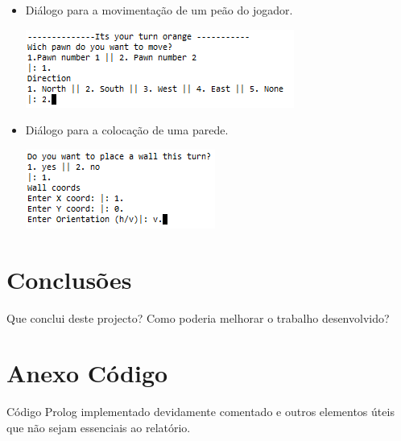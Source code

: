 \documentclass[a4paper]{article}
\begin{document}
  \begin{itemize}
		\item Diálogo para a movimentação de um peão do jogador.	
		\begin{center}
			\includegraphics[scale = 0.7]{fig7.png}
		\end{center}
		\item Diálogo para a colocação de uma parede.
		\begin{center}
			\includegraphics[scale = 0.7]{fig8.png}
		\end{center}
	\end{itemize}






\section{Conclusões}
Que conclui deste projecto? Como poderia melhorar o trabalho desenvolvido?


\clearpage
{}
\renewcommand\refname{Bibliografia}



\newpage
\appendix
\section{Anexo Código}
Código Prolog implementado devidamente comentado e outros elementos úteis que não sejam essenciais ao relatório.
\end{document}
